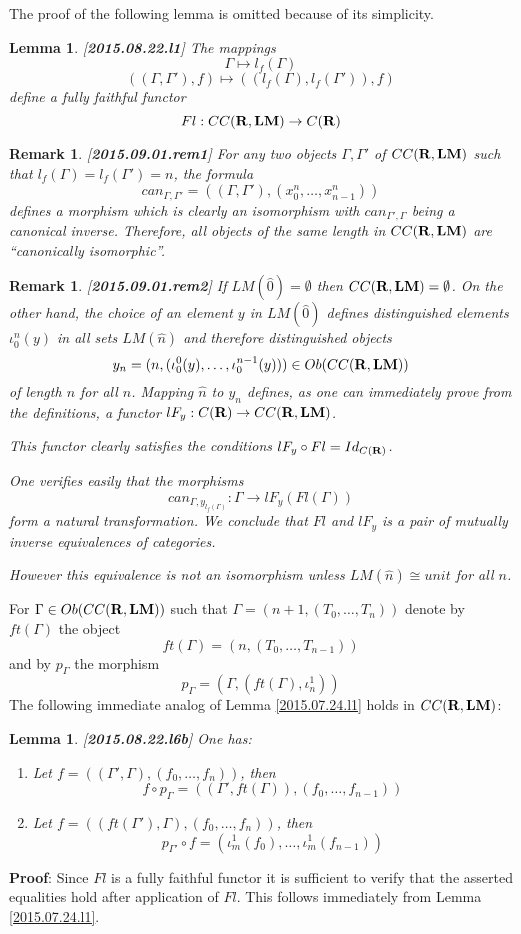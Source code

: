 \documentclass[11pt]{article}
\newenvironment{proof}{{\bf Proof}:}{\vskip 5mm }
\newtheorem{lemma}[proposition]{Lemma}
\newtheorem{remark}[proposition]{Remark}
\newcommand{\llabel}[1]{\label{#1}[{\bf #1}]}
\newcommand{\sr}{\rightarrow}
\newcommand{\rr}{{\bf R}}
\newcommand{\lm}{{\bf LM}}
\newcommand{\wh}{\widehat}
\begin{document}
The proof of the following lemma is omitted because of its simplicity.
%
\begin{lemma}
\llabel{2015.08.22.l1}
The mappings 
%
$$\Gamma\mapsto l_f(\Gamma)$$
$$((\Gamma,\Gamma'),f)\mapsto ((l_f(\Gamma),l_f(\Gamma')),f)$$
%
define a fully faithful functor 
%
$$Fl:CC(\rr,\lm)\sr C(\rr)$$
%
\end{lemma}
%
\begin{remark}\rm
\llabel{2015.09.01.rem1}
For any two objects $\Gamma,\Gamma'$ of $CC(\rr,\lm)$ such that $l_f(\Gamma)=l_f(\Gamma')=n$, the formula
%
$$can_{\Gamma,\Gamma'}=((\Gamma,\Gamma'),(x_0^n,\dots,x_{n-1}^n))$$
%
defines a morphism which is clearly an isomorphism with $can_{\Gamma',\Gamma}$ being a canonical inverse. Therefore, all objects of the same length in $CC(\rr,\lm)$ are ``canonically isomorphic''. 
\end{remark}
%
\begin{remark}\rm
\llabel{2015.09.01.rem2}
If $LM(\wh{0})=\emptyset$ then $CC(\rr,\lm)=\emptyset$. On the other hand, the choice of an element $y$ in $LM(\wh{0})$ defines distinguished elements $\iota_0^n(y)$ in all sets $LM(\wh{n})$ and therefore distinguished objects 
%
$$y_n=(n,(\iota_0^0(y),\dots,\iota_0^{n-1}(y)))\in Ob(CC(\rr,\lm))$$
%
of length $n$ for all $n$. Mapping $\wh{n}$ to $y_n$ defines, as one can immediately prove from the definitions, a functor $lF_{y}:C(\rr)\sr CC(\rr,\lm)$. 

This functor clearly satisfies the conditions $lF_{y}\circ Fl=Id_{C(\rr)}$.

One verifies easily that the morphisms 
%
$$can_{\Gamma,y_{l_f(\Gamma)}}:\Gamma\sr lF_{y}(Fl(\Gamma))$$
%
form a natural transformation. We conclude that $Fl$ and $lF_{y}$ is a pair of mutually inverse equivalences of categories.

However this equivalence is not an isomorphism unless $LM(\wh{n})\cong unit$ for all $n$.
\end{remark}
%


For $\Gamma\in Ob(CC(\rr,\lm))$ such that $\Gamma=(n+1,(T_0,\dots,T_n))$ denote by $ft(\Gamma)$ the object 
%
$$ft(\Gamma)=(n,(T_0,\dots,T_{n-1}))$$
%
and by $p_{\Gamma}$ the morphism 
%
$$p_{\Gamma}=(\Gamma, (ft(\Gamma), \iota_n^1))$$
%
The following immediate analog of Lemma \ref{2015.07.24.l1} holds in $CC(\rr,\lm)$:
%
\begin{lemma}
\llabel{2015.08.22.l6b}
One has:
%
\begin{enumerate}
\item Let $f=((\Gamma',\Gamma),(f_0,\dots,f_n))$, then 
%
$$f\circ p_{\Gamma}=((\Gamma',ft(\Gamma)),(f_0,\dots,f_{n-1}))$$
%
\item Let $f=((ft(\Gamma'),\Gamma),(f_0,\dots,f_n))$, then 
%
$$p_{\Gamma'}\circ f=(\iota_m^1(f_0),\dots,\iota_m^1(f_{n-1}))$$
%
\end{enumerate}
\end{lemma}
%
\begin{proof}
Since $Fl$ is a fully faithful functor it is sufficient to verify that the asserted equalities hold after application of $Fl$. This follows immediately from Lemma \ref{2015.07.24.l1}.
\end{proof}
%
\end{document}
